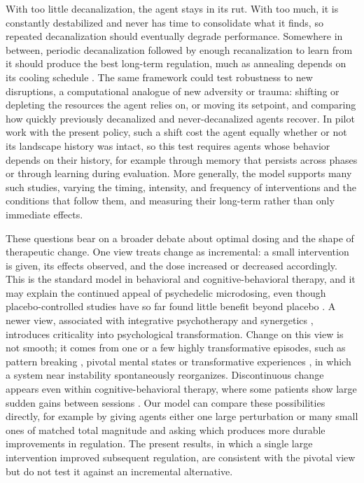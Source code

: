 \documentclass[12pt,fleqn]{article}
\begin{document}
With too little decanalization, the agent stays in its rut. With too much, it is constantly destabilized and never has time to consolidate what it finds, so repeated decanalization should eventually degrade performance. Somewhere in between, periodic decanalization followed by enough recanalization to learn from it should produce the best long-term regulation, much as annealing depends on its cooling schedule \cite{kirkpatrick_optimization_1983, hajek_cooling_1988}. The same framework could test robustness to new disruptions, a computational analogue of new adversity or trauma: shifting or depleting the resources the agent relies on, or moving its setpoint, and comparing how quickly previously decanalized and never-decanalized agents recover. In pilot work with the present policy, such a shift cost the agent equally whether or not its landscape history was intact, so this test requires agents whose behavior depends on their history, for example through memory that persists across phases or through learning during evaluation. More generally, the model supports many such studies, varying the timing, intensity, and frequency of interventions and the conditions that follow them, and measuring their long-term rather than only immediate effects.

These questions bear on a broader debate about optimal dosing and the shape of therapeutic change. One view treats change as incremental: a small intervention is given, its effects observed, and the dose increased or decreased accordingly. This is the standard model in behavioral and cognitive-behavioral therapy, and it may explain the continued appeal of psychedelic microdosing, even though placebo-controlled studies have so far found little benefit beyond placebo \cite{szigeti_microdosing_2021}. A newer view, associated with integrative psychotherapy and synergetics \cite{schiepek_self-organization_2014, schiepek_psychotherapy_2017}, introduces criticality into psychological transformation. Change on this view is not smooth; it comes from one or a few highly transformative episodes, such as pattern breaking \cite{hipolito_pattern_2023}, pivotal mental states \cite{brouwer_pivotal_2021} or transformative experiences \cite{paul_transformative_2014}, in which a system near instability spontaneously reorganizes. Discontinuous change appears even within cognitive-behavioral therapy, where some patients show large sudden gains between sessions \cite{tang_sudden_1999, hayes_change_2007}. Our model can compare these possibilities directly, for example by giving agents either one large perturbation or many small ones of matched total magnitude and asking which produces more durable improvements in regulation. The present results, in which a single large intervention improved subsequent regulation, are consistent with the pivotal view but do not test it against an incremental alternative.
\end{document}

